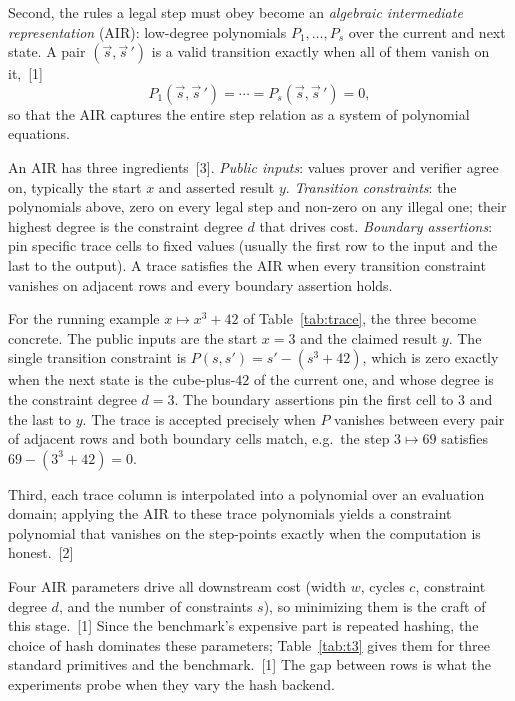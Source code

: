 \documentclass[11pt]{article}
\begin{document}
Second, the rules a legal step must obey become an \emph{algebraic intermediate representation} (AIR):
low-degree polynomials $P_1,\ldots,P_s$ over the current and next state. A pair $(\vec{s},\vec{s}\,')$ is
a valid transition exactly when all of them vanish on it,~[1]
\begin{equation}
  P_1(\vec{s},\vec{s}\,') = \cdots = P_s(\vec{s},\vec{s}\,') = 0,
\end{equation}
so that the AIR captures the entire step relation as a system of polynomial equations.

An AIR has three ingredients~[3]. \emph{Public inputs}: values prover and verifier agree on, typically
the start $x$ and asserted result $y$. \emph{Transition constraints}: the polynomials above, zero on
every legal step and non-zero on any illegal one; their highest degree is the constraint degree $d$ that
drives cost. \emph{Boundary assertions}: pin specific trace cells to fixed values (usually the first row
to the input and the last to the output). A trace satisfies the AIR when every transition constraint
vanishes on adjacent rows and every boundary assertion holds.

For the running example $x\mapsto x^{3}+42$ of Table~\ref{tab:trace}, the three become concrete. The
public inputs are the start $x=3$ and the claimed result $y$. The single transition constraint is
$P(s,s')=s'-(s^{3}+42)$, which is zero exactly when the next state is the cube-plus-$42$ of the current
one, and whose degree is the constraint degree $d=3$. The boundary assertions pin the first cell to $3$
and the last to $y$. The trace is accepted precisely when $P$ vanishes between every pair of adjacent
rows and both boundary cells match, e.g.\ the step $3\mapsto 69$ satisfies $69-(3^{3}+42)=0$.

Third, each trace column is interpolated into a polynomial over an evaluation domain; applying the AIR
to these trace polynomials yields a constraint polynomial that vanishes on the step-points exactly when
the computation is honest.~[2]

Four AIR parameters drive all downstream cost (width $w$, cycles $c$, constraint degree $d$, and the
number of constraints $s$), so minimizing them is the craft of this stage.~[1] Since the benchmark's
expensive part is repeated hashing, the choice of hash dominates these parameters; Table~\ref{tab:t3}
gives them for three standard primitives and the benchmark.~[1] The gap between rows is what the
experiments probe when they vary the hash backend.
\end{document}
